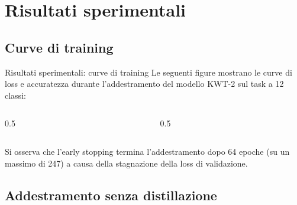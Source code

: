 \documentclass[aspectratio=169]{beamer}
\begin{document}
\section{Risultati sperimentali}

\subsection{Curve di training}

\begin{frame}{Risultati sperimentali: curve di training}
  Le seguenti figure mostrano le curve di loss e accuratezza durante l'addestramento del modello KWT-2 sul task a 12 classi:
  \vspace{0.4em}
  \begin{columns}[c]
    \begin{column}{0.5\textwidth}
      \centering
      
    \end{column}
    \begin{column}{0.5\textwidth}
      \centering
      
    \end{column}
  \end{columns}
  \vspace{0.4em}
  Si osserva che l'early stopping termina l'addestramento dopo 64 epoche (su un massimo di 247) a causa della stagnazione della loss di validazione.
\end{frame}

\subsection{Addestramento senza distillazione}
\end{document}
